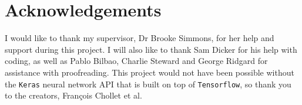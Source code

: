 \documentclass[12pt, onecolumn]{aa}
\begin{document}
\newpage
\section*{Acknowledgements} 
I would like to thank my supervisor, Dr Brooke Simmons, for her help and support during this project. I will also like to thank Sam Dicker for his help with coding, as well as Pablo Bilbao, Charlie Steward and George Ridgard for assistance with proofreading. This project would not have been possible without the \verb|Keras| neural network API that is built on top of \verb|Tensorflow|, so thank you to the creators, Fran\c{c}ois Chollet et al.



 
\end{document}
